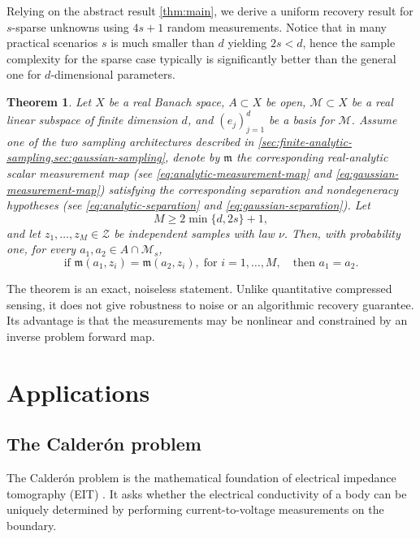 \documentclass[11pt,oneside]{amsart}
\theoremstyle{plain}
\newtheorem{theorem}{Theorem}[section]
\theoremstyle{definition}
\theoremstyle{remark}
\newcommand{\calM}{\mathcal{M}}
\newcommand{\calZ}{\mathcal{Z}}
\begin{document}
Relying on the abstract result \cref{thm:main}, we derive a uniform recovery result for $s$-sparse unknowns using $4s+1$ random measurements. Notice that in many practical scenarios $s$ is much smaller than $d$ yielding $2s<d$, hence the sample complexity for the sparse case typically is significantly better than the general one for $d$-dimensional parameters.
\begin{theorem}\label{thm:sparse}
Let $X$ be a real Banach space, $A\subset X$ be open, $\calM\subset X$ be a real linear subspace of finite dimension $d$, and $(e_j)_{j=1}^d$ be a basis for $\calM$. Assume one of the two sampling architectures described in \cref{sec:finite-analytic-sampling,sec:gaussian-sampling}, denote by $\mathfrak m$ the corresponding real-analytic scalar measurement map (see \eqref{eq:analytic-measurement-map} and \eqref{eq:gaussian-measurement-map}) satisfying the corresponding separation and nondegeneracy hypotheses (see \eqref{eq:analytic-separation} and \eqref{eq:gaussian-separation}). Let
\begin{equation}\label{eq:sparse-bound}
    M\geq 2\min\{d,2s\}+1,
\end{equation}
and let $z_1,\dots,z_M\in\calZ$ be independent samples with law $\nu$. Then, with probability one, for every $a_1,a_2\in A\cap\calM_s$,
\[ \text{if }
   \mathfrak m(a_1,z_i)=\mathfrak m(a_2,z_i),\; \text{for } i=1,\dots,M, \quad \text{then } a_1=a_2.
\]
\end{theorem}

The theorem is an exact, noiseless statement. Unlike quantitative compressed sensing, it does not give robustness to noise or an algorithmic recovery guarantee. Its advantage is that the measurements may be nonlinear and constrained by an inverse problem forward map.

\section{Applications}\label{sec:applications}

\subsection{The Calder\'on problem}\label{sec:calderon}
The Calder\'on problem \cite{calderon2006inverse} is the mathematical foundation of electrical impedance tomography (EIT) \cite{cheney1999electrical,borcea2002electrical}. It asks whether the electrical conductivity of a body can be uniquely determined by performing current-to-voltage measurements on the boundary.
\end{document}
